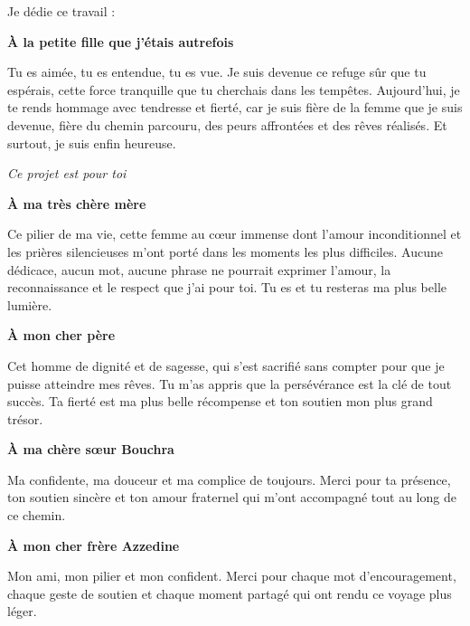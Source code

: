 \documentclass[12pt,a4paper]{report}
\begin{document}
Je dédie ce travail :

\vspace{0.3cm}

\textbf{À la petite fille que j'étais autrefois}

Tu es aimée, tu es entendue, tu es vue. Je suis devenue ce refuge sûr que tu espérais, cette force tranquille que tu cherchais dans les tempêtes. Aujourd'hui, je te rends hommage avec tendresse et fierté, car je suis fière de la femme que je suis devenue, fière du chemin parcouru, des peurs affrontées et des rêves réalisés. Et surtout, je suis enfin heureuse.

\begin{center}
    \textit{Ce projet est pour toi}
\end{center}

\vspace{0.3cm}

\textbf{À ma très chère mère}

Ce pilier de ma vie, cette femme au cœur immense dont l'amour inconditionnel et les prières silencieuses m'ont porté dans les moments les plus difficiles. Aucune dédicace, aucun mot, aucune phrase ne pourrait exprimer l'amour, la reconnaissance et le respect que j'ai pour toi. Tu es et tu resteras ma plus belle lumière.

\vspace{0.3cm}

\textbf{À mon cher père}

Cet homme de dignité et de sagesse, qui s'est sacrifié sans compter pour que je puisse atteindre mes rêves. Tu m'as appris que la persévérance est la clé de tout succès. Ta fierté est ma plus belle récompense et ton soutien mon plus grand trésor.

\vspace{0.3cm}

\textbf{À ma chère sœur Bouchra}

Ma confidente, ma douceur et ma complice de toujours. Merci pour ta présence, ton soutien sincère et ton amour fraternel qui m'ont accompagné tout au long de ce chemin.

\vspace{0.3cm}

\textbf{À mon cher frère Azzedine}

Mon ami, mon pilier et mon confident. Merci pour chaque mot d'encouragement, chaque geste de soutien et chaque moment partagé qui ont rendu ce voyage plus léger.

\vspace{0.3cm}
\end{document}
